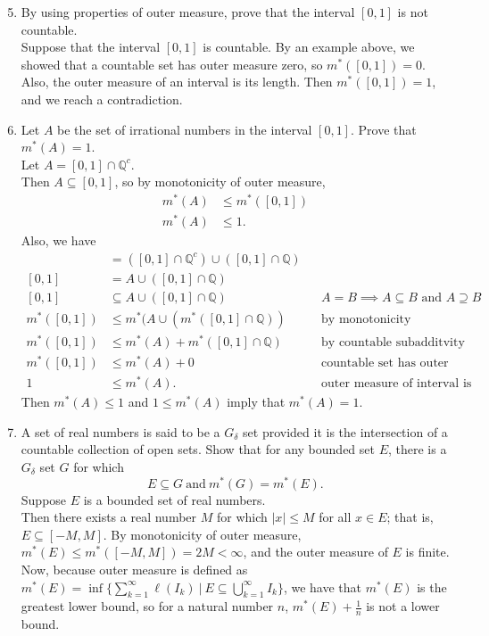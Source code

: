 \begin{enumerate}
	\setcounter{enumi}{4}
	\item By using properties of outer measure, prove that the interval $[0,1]$ is not countable.\\
	Suppose that the interval $[0,1]$ is countable. By an example above, we showed that a countable set has outer measure zero, so $m^*([0,1])=0$.
	Also, the outer measure of an interval is its length. Then $m^*([0,1])=1$, and we reach a contradiction.
	\item Let $A$ be the set of irrational numbers in the interval $[0,1]$. Prove that $m^*(A)=1$.\\
	Let $A=[0,1]\cap\mathbb{Q}^c$.\\
	Then $A\subseteq[0,1]$, so by monotonicity of outer measure, 
	\begin{align*}
		m^*(A)&\le m^*([0,1])\\
		m^*(A)&\le 1.
	\end{align*}
	Also, we have 
	\begin{align*}
		[0,1]&=([0,1]\cap\mathbb{Q}^c)\cup([0,1]\cap\mathbb{Q})\\
		[0,1]&=A\cup([0,1]\cap\mathbb{Q})\\
		[0,1]&\subseteq A\cup([0,1]\cap\mathbb{Q})&&A=B\implies A\subseteq B\text{ and }A\supseteq B\\
		m^*([0,1])&\le m^*(A\cup (m^*([0,1]\cap\mathbb{Q}))&&\text{by monotonicity}\\
		m^*([0,1])&\le m^*(A)+m^*([0,1]\cap\mathbb{Q})&&\text{by countable subadditvity}\\
		m^*([0,1])&\le m^*(A)+0&&\text{countable set has outer measure zero}\\
		1&\le m^*(A).&&\text{outer measure of interval is length}
	\end{align*}
	Then $m^*(A)\le 1$ and $1\le m^*(A)$ imply that $m^*(A)=1$.
	\item A set of real numbers is said to be a $G_\delta$ set provided it is the intersection of a countable collection of open sets.
	Show that for any bounded set $E$, there is a $G_\delta$ set $G$ for which
	\[E\subseteq G \ \text{and}\ m^*(G)=m^*(E).\]
	Suppose $E$ is a bounded set of real numbers.\\
	Then there exists a real number $M$ for which $|x|\le M$ for all $x\in E$; that is, $E\subseteq[-M,M]$.
	By monotonicity of outer measure, $m^*(E)\le m^*([-M,M])=2M<\infty$, and the outer measure of $E$ is finite.\\
	Now, because outer measure is defined as $m^*(E)=\inf\{\sum_{k=1}^\infty\ell(I_k)\ |\ E\subseteq\bigcup_{k=1}^\infty I_k\}$, we have that $m^*(E)$ is the greatest lower bound, so for a natural number $n$, $m^*(E)+\frac{1}{n}$ is not a lower bound.

\end{enumerate}
